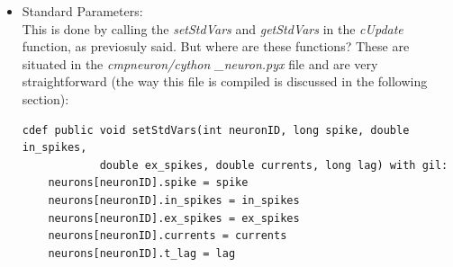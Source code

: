 \documentclass{article}
\begin{document}
\begin{itemize}
\item Standard Parameters:\\
This is done by calling the \emph{setStdVars} and \emph{getStdVars} in the \emph{cUpdate} function, as previosuly said. But where are these functions? These are situated in the \emph{cmpneuron/cython \_neuron.pyx} file and are very straightforward (the way this file is compiled is discussed in the following section):
\begin{verbatim}
cdef public void setStdVars(int neuronID, long spike, double in_spikes, 
            double ex_spikes, double currents, long lag) with gil:
    neurons[neuronID].spike = spike
    neurons[neuronID].in_spikes = in_spikes
    neurons[neuronID].ex_spikes = ex_spikes
    neurons[neuronID].currents = currents
    neurons[neuronID].t_lag = lag



\end{verbatim}
\end{itemize}
\end{document}
